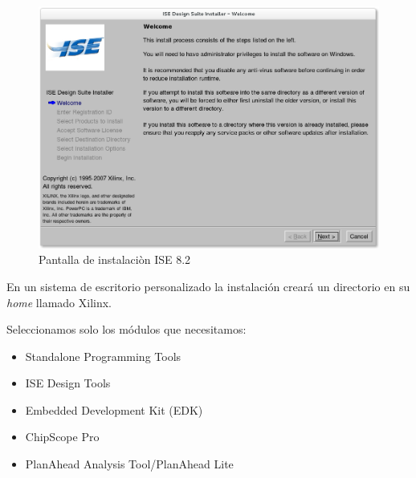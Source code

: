 \begin{figure}[ht]
  \begin{center}
 \includegraphics[scale=.40]{./figuras/Installer.png}
  \caption{Pantalla de instalaciòn ISE 8.2}
 \label{Pantalla instalaciòn ISE 8.2}
 \end{center}
\end{figure}


En un sistema de escritorio personalizado la instalación creará un directorio
en su \emph{home} llamado Xilinx.

Seleccionamos solo los módulos que necesitamos:
\begin{itemize}
 \item Standalone Programming Tools
 \item ISE Design Tools
 \item Embedded Development Kit (EDK)
 \item ChipScope Pro
 \item PlanAhead Analysis Tool/PlanAhead Lite
\end{itemize}


